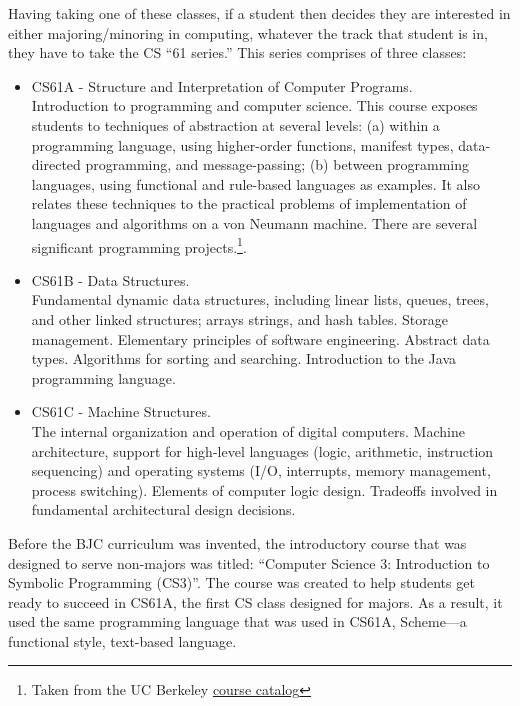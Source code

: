 \documentclass[twoside,openright,titlepage,numbers=noenddot,headinclude,%
               footinclude=true,cleardoublepage=empty,abstractoff,BCOR=5mm,%
               paper=a4,fontsize=11pt,ngerman,american]{scrreprt}
\numberwithin{theorem}{chapter}
\numberwithin{definition}{chapter}
\numberwithin{algorithm}{chapter}
\numberwithin{figure}{chapter}
\numberwithin{table}{chapter}
\numberwithin{equation}{chapter}
\begin{document}
Having taking one of these classes, if a student then decides they are interested in either majoring/minoring in computing, whatever the track that student is in, they have to take the CS ``61 series.'' This series comprises of three classes:
\begin{itemize}
\item CS61A - Structure and Interpretation of Computer Programs.\\Introduction to programming and computer science. This course exposes students to techniques of abstraction at several levels: (a) within a programming language, using higher-order functions, manifest types, data-directed programming, and message-passing; (b) between programming languages, using functional and rule-based languages as examples. It also relates these techniques to the practical problems of implementation of languages and algorithms on a von Neumann machine. There are several significant programming projects.\footnote{Taken from the UC Berkeley \href{http://guide.berkeley.edu/courses/compsci/}{course catalog}}.
\item CS61B - Data Structures.\\Fundamental dynamic data structures, including linear lists, queues, trees, and other linked structures; arrays strings, and hash tables. Storage management. Elementary principles of software engineering. Abstract data types. Algorithms for sorting and searching. Introduction to the Java programming language. 
\item CS61C - Machine Structures.\\The internal organization and operation of digital computers. Machine architecture, support for high-level languages (logic, arithmetic, instruction sequencing) and operating systems (I/O, interrupts, memory management, process switching). Elements of computer logic design. Tradeoffs involved in fundamental architectural design decisions. 

\end{itemize}
Before the BJC curriculum was invented, the introductory course that was designed to serve non-majors was titled: ``Computer Science 3: Introduction to Symbolic Programming (CS3)''. The course was created to help students get ready to succeed in CS61A, the first CS class designed for majors. As a result, it used the same programming language that was used in CS61A, Scheme---a functional style, text-based language.
\end{document}
